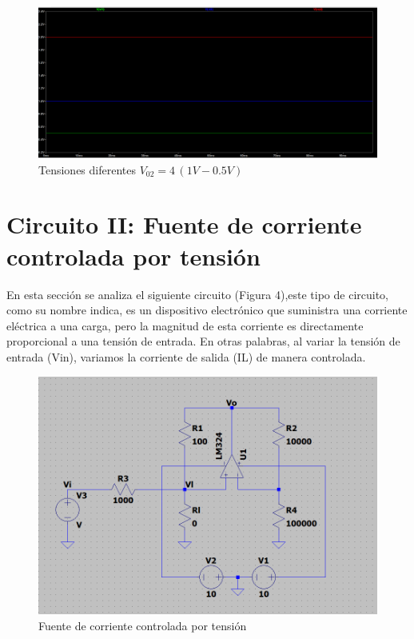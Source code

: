 \documentclass[12pt]{article}
\begin{document}
		\begin{figure}[h!]
			\centering
			\includegraphics[width=1\linewidth]{Simulaciones-Resultados/Circuito1_Vo2-Vi1-Vi2}
			\caption{Tensiones diferentes $V_{02}=4\,(1V-0.5V)$}
			\label{fig:circuito1vo2-vi1-vi2}
		\end{figure}\newpage
			
	\section {Circuito II: Fuente de corriente controlada por tensión}
		En esta sección se analiza el siguiente circuito (Figura 4),este tipo de circuito, como su nombre indica, es un dispositivo electrónico que suministra una corriente eléctrica a una carga, pero la magnitud de esta corriente es directamente proporcional a una tensión de entrada. En otras palabras, al variar la tensión de entrada (Vin), variamos la corriente de salida (IL) de manera controlada.
		
		\begin{figure}[h]
			\centering
			\includegraphics[width=1\linewidth]{Simulaciones-Resultados/Circuito2_esquematico}
			\caption{Fuente de corriente controlada por tensión}
			\label{fig:circuito2esquematico}
		\end{figure}
\end{document}
